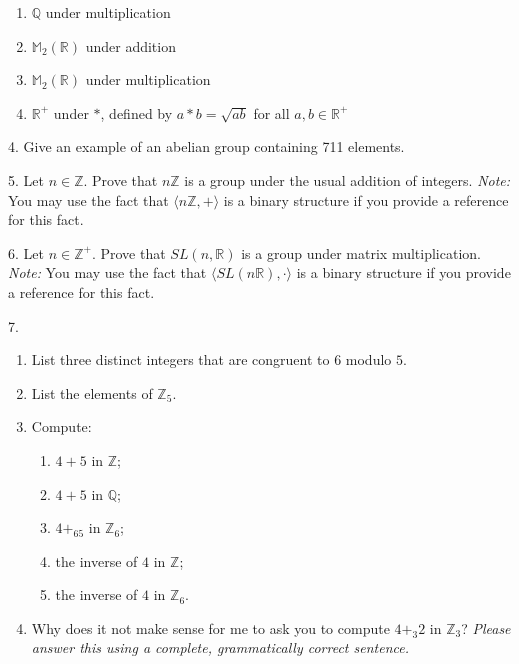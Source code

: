 \documentclass[10pt,openany,oneside]{book}
\theoremstyle{plain}
\theoremstyle{definition}
\theoremstyle{definition}
\theoremstyle{definition}
\theoremstyle{definition}
\numberwithin{equation}{section}
\def\Z{\mathbb{Z}}
\def\R{\mathbb{R}}
\def\Q{\mathbb{Q}}
\def\M{\mathbb{M}}
\begin{document}
\begin{exerciselist}
\begin{enumerate}[label=(\alph*)]
\item\hypertarget{li-115}{}\(\Q\) under multiplication%
\item\hypertarget{li-116}{}\(\M_2(\R)\) under addition%
\item\hypertarget{li-117}{}\(\M_2(\R)\) under multiplication%
\item\hypertarget{li-118}{}\(\R^+\) under \(*\), defined by \(a*b=\sqrt{ab}\) for all \(a,b\in \R^+\)%
\end{enumerate}
%
\par\smallskip
\item[4.]\hypertarget{exercise-15}{}Give an example of an abelian group containing 711 elements.%
\par\smallskip
\item[5.]\hypertarget{exercise-16}{}Let \(n\in \Z\). Prove that \(n\Z\) is a group under the usual addition of integers. \emph{Note:} You may use the fact that \(\langle n\Z,+\rangle\) is a binary structure if you provide a reference for this fact.%
\par\smallskip
\item[6.]\hypertarget{exercise-17}{}Let \(n\in \Z^+\). Prove that \(SL(n,\R)\) is a group under matrix multiplication. \emph{Note:} You may use the fact that \(\langle SL(n\R),\cdot\rangle\) is a binary structure if you provide a reference for this fact.%
\par\smallskip
\item[7.]\hypertarget{exercise-18}{}\leavevmode%
\begin{enumerate}[label=(\alph*)]
\item\hypertarget{li-123}{}List three distinct integers that are congruent to \(6\) modulo \(5\).%
\item\hypertarget{li-124}{}List the elements of \(\Z_5\).%
\item\hypertarget{li-125}{}Compute: %
\begin{enumerate}[label=\roman*.]
\item\hypertarget{li-126}{}\(4+5\) in \(\Z\);%
\item\hypertarget{li-127}{}\(4+5\) in \(\Q\);%
\item\hypertarget{li-128}{}\(4+_65\) in \(\Z_6\);%
\item\hypertarget{li-129}{}the inverse of \(4\) in \(\Z\);%
\item\hypertarget{li-130}{}the inverse of \(4\) in \(\Z_6\).%
\end{enumerate}
%
\item\hypertarget{li-131}{}Why does it not make sense for me to ask you to compute \(4+_3 2\) in \(\Z_3\)? \emph{Please answer this using a complete, grammatically correct sentence.}%

\end{enumerate}
\end{exerciselist}
\end{document}
